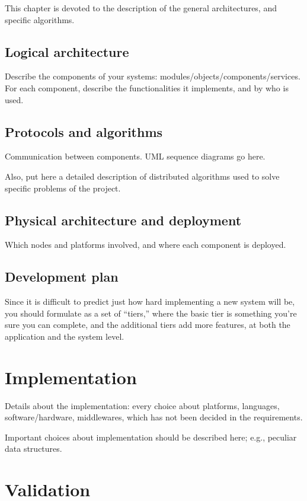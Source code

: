 \documentclass{memoir}
\begin{document}
This chapter is devoted to the description of the general architectures, and specific algorithms.

\section{Logical architecture}
Describe the components of your systems: modules/objects/components/services.
For each component, describe the functionalities it implements, and by who is used.

\section{Protocols and algorithms}
Communication between components.  UML sequence diagrams go here.

Also, put here a detailed description of distributed algorithms used to solve specific problems of the project.

\section{Physical architecture and deployment}
Which nodes and platforms involved, and where each component is deployed.

\section{Development plan}
Since it is difficult to predict just how hard implementing a new system will be, you should formulate as a set of ``tiers,'' where the basic tier is something you’re sure you can complete, and the additional tiers add more features, at both the application and the system level.

\chapter{Implementation}

Details about the implementation: every choice about platforms, languages, software/hardware, middlewares, which has not been decided in the requirements.


Important choices about implementation should be described here; e.g., peculiar data structures.


\chapter{Validation}
\end{document}
